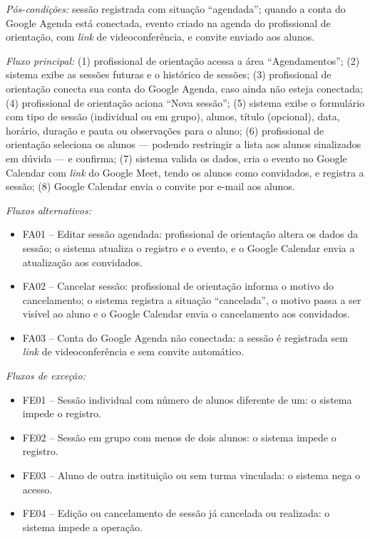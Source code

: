 \textit{Pós-condições:} sessão registrada com situação ``agendada''; quando a conta do Google Agenda está conectada, evento criado na agenda do profissional de orientação, com \textit{link} de videoconferência, e convite enviado aos alunos.

\textit{Fluxo principal:} (1) profissional de orientação acessa a área ``Agendamentos''; (2) sistema exibe as sessões futuras e o histórico de sessões; (3) profissional de orientação conecta sua conta do Google Agenda, caso ainda não esteja conectada; (4) profissional de orientação aciona ``Nova sessão''; (5) sistema exibe o formulário com tipo de sessão (individual ou em grupo), alunos, título (opcional), data, horário, duração e pauta ou observações para o aluno; (6) profissional de orientação seleciona os alunos — podendo restringir a lista aos alunos sinalizados em dúvida — e confirma; (7) sistema valida os dados, cria o evento no Google Calendar com \textit{link} do Google Meet, tendo os alunos como convidados, e registra a sessão; (8) Google Calendar envia o convite por e-mail aos alunos.

\textit{Fluxos alternativos:}

\begin{itemize}[label={},leftmargin=\parindent,itemsep=0pt,topsep=0pt]
  \item FA01 – Editar sessão agendada: profissional de orientação altera os dados da sessão; o sistema atualiza o registro e o evento, e o Google Calendar envia a atualização aos convidados.
  \item FA02 – Cancelar sessão: profissional de orientação informa o motivo do cancelamento; o sistema registra a situação ``cancelada'', o motivo passa a ser visível ao aluno e o Google Calendar envia o cancelamento aos convidados.
  \item FA03 – Conta do Google Agenda não conectada: a sessão é registrada sem \textit{link} de videoconferência e sem convite automático.
\end{itemize}

\textit{Fluxos de exceção:}

\begin{itemize}[label={},leftmargin=\parindent,itemsep=0pt,topsep=0pt]
  \item FE01 – Sessão individual com número de alunos diferente de um: o sistema impede o registro.
  \item FE02 – Sessão em grupo com menos de dois alunos: o sistema impede o registro.
  \item FE03 – Aluno de outra instituição ou sem turma vinculada: o sistema nega o acesso.
  \item FE04 – Edição ou cancelamento de sessão já cancelada ou realizada: o sistema impede a operação.
\end{itemize}

